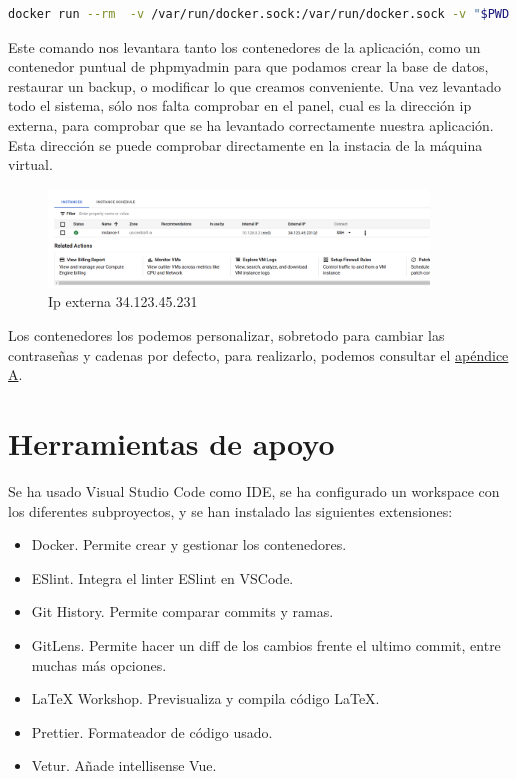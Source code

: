 \documentclass[11pt,spanish,listoffigures,listoftables]{tfgetsinf}
\begin{document}
\begin{lstlisting}[language=bash, caption={comando docker para lanzar docker-compose}]
docker run --rm  -v /var/run/docker.sock:/var/run/docker.sock -v "$PWD:$PWD"   -w="$PWD"  docker/compose:1.24.0 up -d
\end{lstlisting}
Este comando nos levantara tanto los contenedores de la aplicación, como un contenedor puntual de phpmyadmin para que podamos crear la base de datos, restaurar un backup, o modificar lo que creamos conveniente.
Una vez levantado todo el sistema, sólo nos falta comprobar en el panel, cual es la dirección ip externa, para comprobar que se ha levantado correctamente nuestra aplicación. Esta dirección se puede comprobar directamente en la instacia de la máquina virtual.
\begin{figure}[h!] %
  \centering
   \includegraphics[width=0.90\textwidth]{img/ipexterna.png}
   \caption{Ip externa 34.123.45.231}
   \label{fig:ipexterna}
 \end{figure}

Los contenedores los podemos personalizar, sobretodo para cambiar las contraseñas y cadenas por defecto, para realizarlo, podemos consultar el \hyperref[chapter:config]{apéndice A}.

\chapter{Herramientas de apoyo}

Se ha usado Visual Studio Code como IDE, se ha configurado un workspace con los diferentes subproyectos, y se han instalado las siguientes extensiones:
\begin{itemize}
  \item Docker. Permite crear y gestionar los contenedores.
  \item ESlint. Integra el linter ESlint en VSCode.
  \item Git History. Permite comparar commits y ramas.
  \item GitLens. Permite hacer un diff de los cambios frente el ultimo commit, entre muchas más opciones.
  \item LaTeX Workshop. Previsualiza y compila código LaTeX.
  \item Prettier. Formateador de código usado.
  \item Vetur. Añade intellisense Vue.
\end{itemize}
\end{document}

